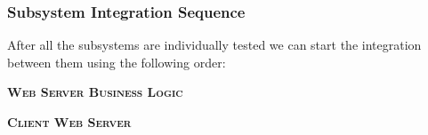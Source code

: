 \subsubsection{Subsystem Integration Sequence}

After all the subsystems are individually tested we can start the integration
between them using the following order: \newline

\centerline{\textsc{\textbf{Web Server \textrightarrow{} Business Logic}}}
\centerline{\textsc{\textbf{Client \textrightarrow{} Web Server}}}
